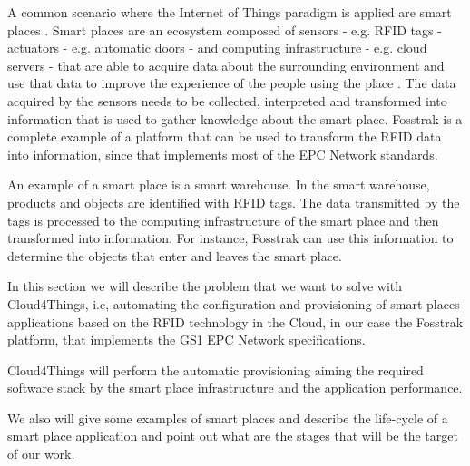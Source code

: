 A common scenario where the Internet of Things paradigm is applied are smart places \cite{atzori2010internet}.
Smart places are an ecosystem composed of sensors - e.g. RFID tags - actuators - e.g. automatic doors -
and computing infrastructure - e.g. cloud servers - that are able to acquire data about the surrounding
environment and use that data to improve the experience of the people using the place \cite{cook2004smart}.
The data acquired by the sensors needs to be collected, interpreted and transformed into information that
is used to gather knowledge about the smart place. Fosstrak is a complete example of a platform that
can be used to transform the RFID data into information, since that implements most of the EPC Network
standards.

An example of a smart place is a smart warehouse. In the smart warehouse, products and objects
are identified with RFID tags. The data transmitted by the tags is processed to the computing
infrastructure of the smart place and then transformed into information. For instance,
Fosstrak can use this information to determine the objects that enter and leaves the smart place.


In this section we will describe the problem that we want to solve with Cloud4Things, i.e, automating
the configuration and provisioning of smart places applications based on the RFID technology in the
Cloud, in our case the Fosstrak platform, that implements the GS1 EPC Network specifications.

Cloud4Things will perform the automatic provisioning aiming the required software stack by the smart
place infrastructure and the application performance.

We also will give some examples of smart places and describe the life-cycle of a smart place
application and point out what are the stages that will be the target of our work.
